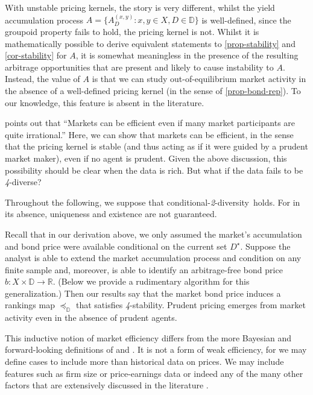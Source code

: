 \documentclass[ecta,nameyear,draft]{econsocart}
\newcommand{\R}{\mathbb R}
\newcommand{\mbbd}{{\mathds D}}
\newcommand{\past}{{D^\star}}
\newcommand{\xy}{{(x, y)}}
\newcommand{\stability}{\textit{4}-\textup{{stability}}}
\newcommand{\condtwodiv}{\textup{conditional-\textit{2}-diversity}}
\theoremstyle{plain}
\theoremstyle{remark}
\begin{document}
With unstable pricing kernels, the story is very different, whilst the yield
accumulation process $A = \{A^{\xy}_D : x, y \in X, D \in \mbbd\}$ is
well-defined, since the groupoid property fails to hold, the pricing kernel is
not. Whilst it is mathematically possible to derive equivalent statements to
\cref{prop-stability} and \cref{cor-stability} for $A$, it is somewhat
meaningless in the presence of the resulting arbitrage opportunities that are
present and likely to cause instability to $A$.  Instead, the value of $A$ is
that we can study out-of-equilibrium market activity in the absence of a
well-defined pricing kernel (in the sense of \cref{prop-bond-rep}). To our
knowledge, this feature is absent in the literature.

 points out that ``Markets can be efficient
even if many market participants are quite irrational.'' Here, we can show that
markets can be efficient, in the sense that the pricing kernel is stable (and
thus acting as if it were guided by a prudent market maker), even if no agent
is prudent. Given the above discussion, this possibility should be clear when
the data is rich.  But what if the data fails to be \emph{4}-diverse?

Throughout the following, we suppose that \condtwodiv\ holds. For in its
absence, uniqueness and existence are not guaranteed.

Recall that in our derivation above, we only assumed the market's accumulation
and bond price were available conditional on the current set $\past$. Suppose
the analyst is able to extend the market accumulation process and condition on
any finite sample and, moreover, is able to identify an arbitrage-free bond
price $b: X \times \mbbd \rightarrow \R$. (Below we provide a rudimentary
algorithm for this {generalization}.) Then our results say that the market bond
price induces a rankings map $\preceq_{\mbbd}$ that satisfies \stability.
Prudent pricing emerges from market activity even in the absence of prudent
agents.

This inductive notion of market efficiency differs from the more Bayesian and
forward-looking definitions of \citet{fama1970efficient} and
\citet{malkiel2003efficient}. It is not a form of weak efficiency, for we may
define cases to include more than historical data on prices. We may include
features such as firm size or price-earnings data or indeed any of the many
other factors that are extensively discussed in the literature
\citep{fama2015five,harvey2021lucky,gu2020empirical}.
\end{document}

